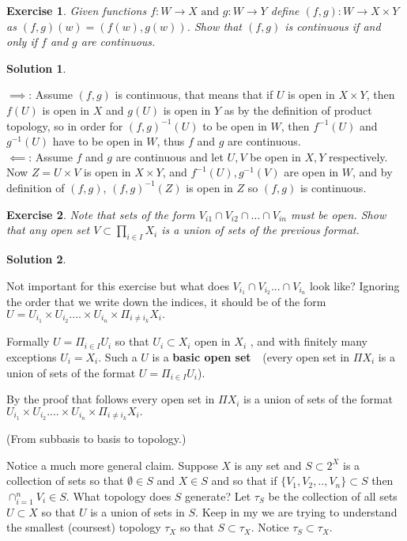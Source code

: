 \documentclass[11pt,a4paper]{article}
\newtheorem{Ex}{Exercise}
\newtheorem{Sol}{Solution}
\begin{document}
\begin{Ex}
	Given functions $f: W \rightarrow X \text{ and } g: W \rightarrow Y$ define $(f,g): W \rightarrow X \times Y$ as $(f,g)(w)=(f(w),g(w))$. Show that $(f,g)$ is continuous if and only if $f$ and $g$ are continuous.  
\end{Ex} 
\begin{Sol} \end{Sol} 
\noindent $\implies$: Assume $(f,g)$ is continuous, that means that if $U$ is open in $X \times Y$, then $f(U)$ is open in $X$ and $g(U)$ is open in $Y$ as by the definition of product topology, so in order for $(f,g)^{-1}(U)$ to be open in $W$, then $f^{-1}(U)$ and $g^{-1}(U)$ have to be open in $W$, thus $f$ and $g$ are continuous. \\
\noindent $\impliedby$: Assume $f$ and $g$ are continuous and let $U, V$ be open in $X, Y$ respectively. Now $Z = U \times V$ is open in $X \times Y$, and $f^{-1}(U), g^{-1}(V)$ are open in $W$, and by definition of $(f,g)$, $(f,g)^{-1}(Z)$ is open in  $Z$ so $(f,g)$ is continuous.

\begin{Ex}
	Note that sets of the form $V_{i1} \cap V_{i2} \cap \dots \cap V_{in}$ must be open. Show that any open set $V \subset \prod_{i \in I}X_i$ is a union of sets of the previous format.
\end{Ex}  

\begin{Sol} \end{Sol} 
\noindent Not important for this exercise but what does $V_{i_{1}}\cap
V_{i_{2}}...\cap V_{i_{n}}$ look like? Ignoring the order that we write down
the indices, it should be of the form $U=U_{i_{1}}\times U_{i_{2}}....\times
U_{i_{n}}\times \Pi _{i\neq i_{k}}X_{i}.$

Formally $U=\Pi _{i\in I}U_{i}$ so that $U_{i}\subset X_{i}$ open in $X_{i}$
, and with finitely many exceptions $U_{i}=X_{i}.$ Such a $U$ is a \textbf{
	basic open set }$\ $\ (every open set in $\Pi X_{i}$ is a union of sets of
the format $U=\Pi _{i\in I}U_{i}$).

By the proof that follows every open set in $\Pi X_{i}$ is a union of sets
of the format $U_{i_{1}}\times U_{i_{2}}....\times U_{i_{n}}\times \Pi
_{i\neq i_{k}}X_{i}.$

(From subbasis to basis to topology.)

Notice a much more general claim. Suppose $X$ is any set and $S\subset 2^{X}$
is a collection of sets so that $\emptyset \in S$ and $X\in S$ and so that
if $\{V_{1},V_{2},..,V_{n}\}\subset S$ then $\cap _{i=1}^{n}V_{i}\in S.$
What topology does $S$ generate? Let $\tau _{S}$ be the collection of all
sets $U\subset X$ so that $U$ is a union of sets in $S.$ Keep in my we are
trying to understand the smallest (coursest) topology $\tau _{X}$ so that $%
S\subset \tau _{X}.$ Notice $\tau _{S}\subset \tau _{X}.$
\end{document}
